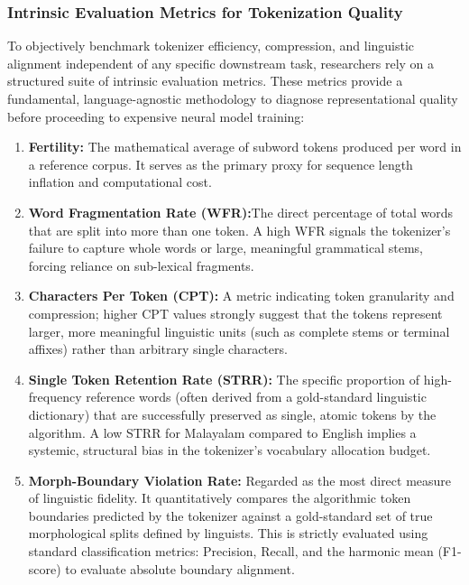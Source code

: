\documentclass[12pt]{article}
\begin{document}
	\subsubsection{Intrinsic Evaluation Metrics for Tokenization Quality }
	
	To objectively benchmark tokenizer efficiency, compression, and linguistic alignment independent of any specific downstream task, researchers rely on a structured suite of intrinsic evaluation metrics. These metrics provide a fundamental, language-agnostic methodology to diagnose representational quality before proceeding to expensive neural model training: 
	\begin{enumerate}
		\item \textbf{Fertility:} The mathematical average of subword tokens produced per word in a reference corpus. It serves as the primary proxy for sequence length inflation and computational cost. 
		
		\item \textbf{Word Fragmentation Rate (WFR):}The direct percentage of total words that are split into more than one token. A high WFR signals the tokenizer's failure to capture whole words or large, meaningful grammatical stems, forcing reliance on sub-lexical fragments. 
		
		\item \textbf{Characters Per Token (CPT):} A metric indicating token granularity and compression; higher CPT values strongly suggest that the tokens represent larger, more meaningful linguistic units (such as complete stems or terminal affixes) rather than arbitrary single characters. 
		
		\item \textbf{Single Token Retention Rate (STRR):} The specific proportion of high-frequency reference words (often derived from a gold-standard linguistic dictionary) that are successfully preserved as single, atomic tokens by the algorithm. A low STRR for Malayalam compared to English implies a systemic, structural bias in the tokenizer's vocabulary allocation budget.
		
		\item \textbf{Morph-Boundary Violation Rate:} Regarded as the most direct measure of linguistic fidelity. It quantitatively compares the algorithmic token boundaries predicted by the tokenizer against a gold-standard set of true morphological splits defined by linguists. This is strictly evaluated using standard classification metrics: Precision, Recall, and the harmonic mean (F1-score) to evaluate absolute boundary alignment. 
	\end{enumerate}
	
\end{document}
